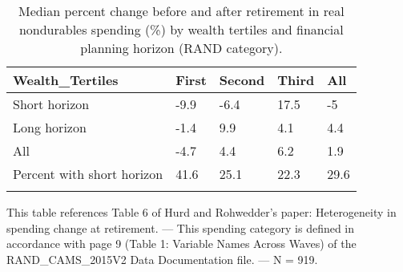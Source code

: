 \begin{table}[tbp] \centering
{}

\caption{Median percent change before and after retirement in real nondurables spending (\%) by wealth tertiles and financial planning horizon (RAND category).}
\begin{tabularx}{\textwidth}{lCCCC}

\toprule
{Wealth\_Tertiles}&{First}&{Second}&{Third}&{All} \tabularnewline
\midrule\addlinespace[1.5ex]
Short horizon&-9.9&-6.4&17.5&-5 \tabularnewline
Long horizon&-1.4&9.9&4.1&4.4 \tabularnewline
All&-4.7&4.4&6.2&1.9 \tabularnewline
Percent with short horizon&41.6&25.1&22.3&29.6 \tabularnewline
\bottomrule \addlinespace[1.5ex]

\end{tabularx}
\begin{flushleft}
\footnotesize This table references Table 6 of Hurd and Rohwedder's paper: Heterogeneity in spending change at retirement. \linebreak --- \linebreak This spending category is defined in accordance with page 9 (Table 1: Variable Names Across Waves) of the RAND\_CAMS\_2015V2 Data Documentation file. \linebreak --- \linebreak N = 919.
\end{flushleft}
\end{table}
